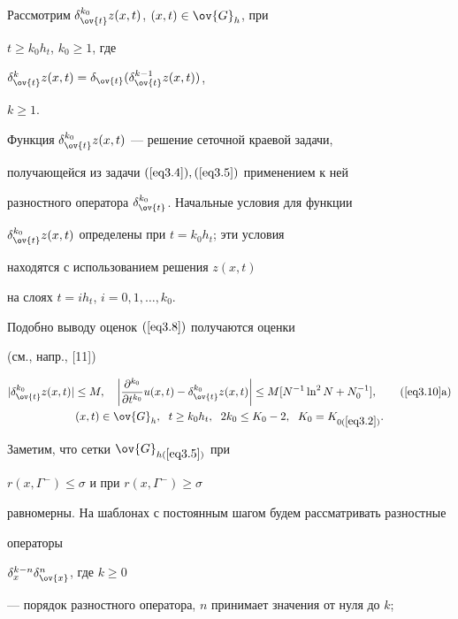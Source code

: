 Рассмотрим $\delta^{k_0}_{\ov{t}}z(x,t)$, $(x,t)\in\ov{G}_h$, при


$t\ge k_0h_t$, $k_0\ge 1$, где


$\delta^k_{\ov{t}}z(x,t)=\delta_{\ov{t}}(\delta_{\ov{t}}^{k-1}z(x,t))$,


$k\ge 1$.


Функция $\delta^{k_0}_{\ov{t}}z(x,t)$ --- решение сеточной краевой задачи,


получающейся из задачи $(\ref{eq3.4}), (\ref{eq3.5})$ применением к ней


разностного оператора $\delta^{k_0}_{\ov{t}}$. Начальные условия для функции


$\delta^{k_0}_{\ov{t}}z(x,t)$ определены при $t=k_0h_t$; эти условия


находятся с использованием решения $z(x,t)$


на слоях $t=ih_t$, $i=0,1,\dotsc,k_0$.





Подобно выводу оценок $(\ref{eq3.8})$ получаются оценки


(см., напр., [11])


\begin{gather}


\label{eq3.10}


|\delta^{k_0}_{\ov{t}}z(x,t)|\le M,\quad


\bigg|\frac{\pa^{k_0}}{\pa t^{k_0}}u(x,t)-\delta^{k_0}_{\ov{t}}z(x,t)


\bigg|\le


M[N^{-1}\ln^2 N+N_0^{-1}],\tag{\ref{eq3.10}\text{a}}\\


(x,t)\in\ov{G}_h,\ \; t\ge k_0 h_t,\ \; 2k_0\le K_0-2,


\ \; K_0=K_{0(\ref{eq3.2})}.\notag


\end{gather}





Заметим, что сетки $\ov{G}_{h(\ref{eq3.5})}$ при


$r(x,\varGamma^{-})\le \sigma$ и при $r(x,\varGamma^{-})\ge\sigma$


равномерны. На шаблонах с постоянным шагом будем рассматривать разностные


операторы


$\delta^{k-n}_x\delta_{\ov{x}}^n$, где $k\ge 0$


--- порядок разностного оператора, $n$ принимает значения от нуля до $k$;


